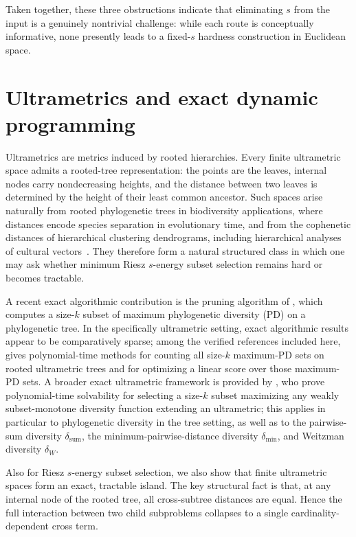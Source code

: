 \documentclass[11pt]{article}
\begin{document}
Taken together, these three obstructions indicate that eliminating \(s\) from the input is a genuinely nontrivial challenge: while each route is conceptually informative, none presently leads to a fixed-\(s\) hardness construction in Euclidean space.

\section{Ultrametrics and exact dynamic programming}

Ultrametrics are metrics induced by rooted hierarchies. Every finite ultrametric space admits a rooted-tree representation: the points are the leaves, internal nodes carry nondecreasing heights, and the distance between two leaves is determined by the height of their least common ancestor. Such spaces arise naturally from rooted phylogenetic trees in biodiversity applications, where distances encode species separation in evolutionary time, and from the cophenetic distances of hierarchical clustering dendrograms, including hierarchical analyses of cultural vectors~\cite{HartmannSteel2006,StivalaEtAl2014}. They therefore form a natural structured class in which one may ask whether minimum Riesz $s$-energy subset selection remains hard or becomes tractable.

A recent exact algorithmic contribution is the pruning algorithm of
\cite{MinhKlaereHaeseler2006}, which computes a size-$k$ subset of maximum
phylogenetic diversity (PD) on a phylogenetic tree. In the specifically
ultrametric setting, exact algorithmic results appear to be comparatively sparse;
among the verified references included here, \cite{MansonSempleSteel2022}
gives polynomial-time methods for counting all size-$k$ maximum-PD sets on rooted
ultrametric trees and for optimizing a linear score over those maximum-PD sets.
A broader exact ultrametric framework is provided by
\cite{ArenasMerklPichlerRiveros2024}, who prove polynomial-time solvability for
selecting a size-$k$ subset maximizing any weakly subset-monotone diversity
function extending an ultrametric; this applies in particular to phylogenetic
diversity in the tree setting, as well as to the pairwise-sum diversity
$\delta_{\mathrm{sum}}$, the minimum-pairwise-distance diversity
$\delta_{\min}$, and Weitzman diversity $\delta_W$.

Also for Riesz $s$-energy subset selection, we also show that finite ultrametric spaces form an exact, tractable island. The key structural fact is that, at any internal node of the rooted tree, all cross-subtree distances are equal. Hence the full interaction between two child subproblems collapses to a single cardinality-dependent cross term.
\end{document}
